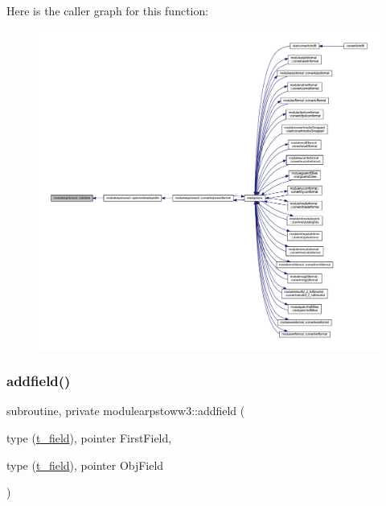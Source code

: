 Here is the caller graph for this function\+:\nopagebreak
\begin{figure}[H]
\begin{center}
\leavevmode
\includegraphics[width=350pt]{namespacemodulearpstoww3_a81436aea40d31bddb32f553e227a991d_icgraph}
\end{center}
\end{figure}
\mbox{\label{namespacemodulearpstoww3_a0277d24244051759af2fcc3106ef5a08}} 
\subsubsection{\texorpdfstring{addfield()}{addfield()}}
{\footnotesize\ttfamily subroutine, private modulearpstoww3\+::addfield (\begin{DoxyParamCaption}\item[{type (\mbox{\hyperlink{structmodulearpstoww3_1_1t__field}{t\+\_\+field}}), pointer}]{First\+Field,  }\item[{type (\mbox{\hyperlink{structmodulearpstoww3_1_1t__field}{t\+\_\+field}}), pointer}]{Obj\+Field }\end{DoxyParamCaption})\hspace{0.3cm}{\ttfamily [private]}}

